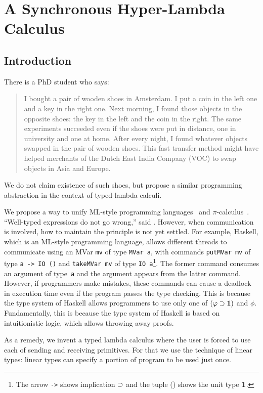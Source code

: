 \chapter{A Synchronous Hyper-Lambda Calculus}
\label{ch:exchange}

\section{Introduction}

There is a PhD student who says:
\begin{quotation}
 I bought a pair of wooden shoes in Amsterdam.  I put
 a coin in the left one and a key in the right one.
 Next morning, I found those objects in the opposite shoes:
 the key in the left and the coin in the right.
 The same experiments succeeded even if the shoes were put in distance, one in
 university and one at home.  After every night, I found whatever objects swapped in
 the pair of wooden shoes.
 This fast transfer method might have helped merchants of
 the Dutch East India Company (VOC) to swap objects in Asia and Europe.
\end{quotation}
We do not claim existence of such shoes, but propose
a similar programming abstraction in the context of typed lambda calculi.

We propose a way to unify ML-style programming
languages~\citep{milner1997definition, marlow2010haskell} and
$\pi$-calculus~\citep{milner1999communicating}.
``Well-typed expressions do not go wrong,'' said \citet{milner1978}.
However, when communication is involved, how to maintain the principle
is not yet settled.
For example, Haskell, which is an ML-style programming language,
allows different threads to communicate using an MVar \texttt{mv} of
type \texttt{MVar
a}, with commands
\texttt{putMVar mv} of type \texttt{a -> IO ()} and \texttt{takeMVar mv}
of type \texttt{IO
a}\footnote{The arrow \texttt{->} shows implication $\supset$ and the tuple
() shows the unit type $\mathbf{1}$.}.
The former command consumes an argument of type~\texttt{a} and
the argument appears from the latter command.
However, if programmers make mistakes, these commands can
cause a deadlock in execution time even if the program passes the type
checking.
This is because the type system of Haskell allows programmers to
use only one of $(\varphi\supset \mathbf{1})$ and $\phi$.
Fundamentally, this is because the type system of Haskell
is based on intuitionistic logic, which allows throwing away proofs.

As a remedy, we invent a typed lambda calculus where
the user is forced to use each of sending and receiving primitives.
For that we use the technique of linear types:
linear types can specify a portion of program to be used
just once.


